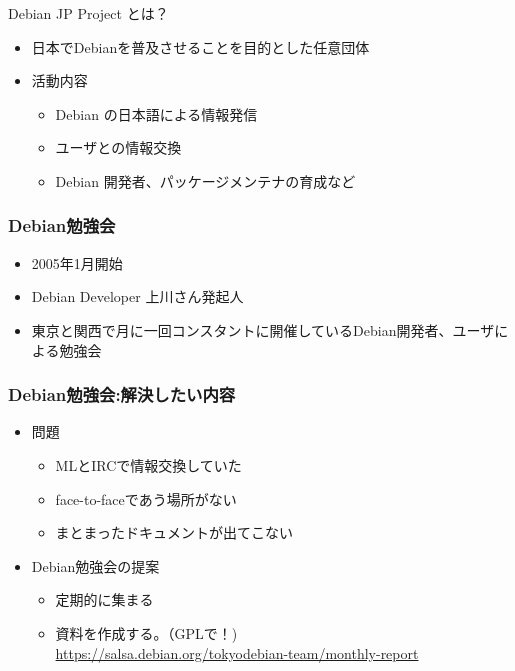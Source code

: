  
\begin{frame}{Debian JP Project とは？}

\begin{itemize}
  \item 日本でDebianを普及させることを目的とした任意団体
  \item 活動内容
  \begin{itemize}
    \item Debian の日本語による情報発信
    \item ユーザとの情報交換
    \item Debian 開発者、パッケージメンテナの育成など
  \end{itemize}
\end{itemize}

\end{frame}


\begin{frame}
  
\frametitle{Debian勉強会}
\begin{itemize}
 \item 2005年1月開始
 \item Debian Developer 上川さん発起人
\item 東京と関西で月に一回コンスタントに開催しているDebian開発者、ユーザによる勉強会
\end{itemize}

\end{frame}

\begin{frame}

\frametitle{Debian勉強会:解決したい内容}
\begin{itemize}
 \item<1-> 問題
       \begin{itemize}
	\item MLとIRCで情報交換していた
	\item face-to-faceであう場所がない
	\item まとまったドキュメントが出てこない
       \end{itemize}
 \item<2-> Debian勉強会の提案
       \begin{itemize}
	\item 定期的に集まる
	\item 資料を作成する。（GPLで！) \\
	  {\small \url{https://salsa.debian.org/tokyodebian-team/monthly-report}}
       \end{itemize}
\end{itemize}

\end{frame}

